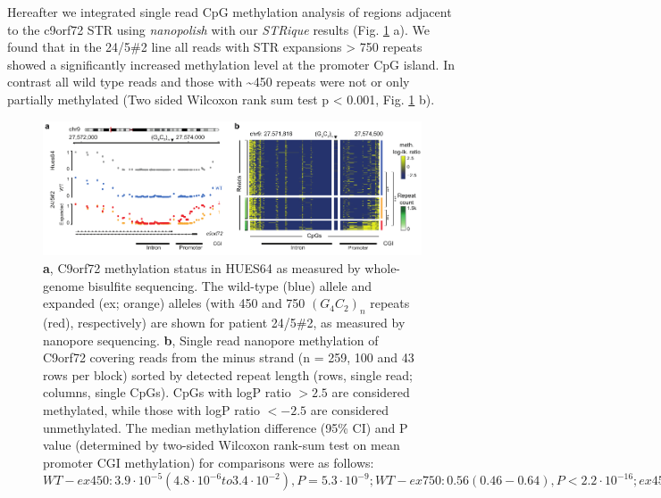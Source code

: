 Hereafter we integrated single read CpG methylation analysis of regions adjacent to the c9orf72 STR using \textit{nanopolish} \cite{Simpson2017} with our \textit{STRique} results (Fig. \ref{fig:strique:methylation_c9orf72_region} a). We found that in the 24/5\#2 line all reads with STR expansions > 750 repeats showed a significantly increased methylation level at the promoter CpG island. In contrast all wild type reads and those with \textasciitilde450 repeats were not or only partially methylated (Two sided Wilcoxon rank sum test p < 0.001, Fig. \ref{fig:strique:methylation_c9orf72_region} b).

\begin{figure}[h]
    \centering
    \includegraphics[width=1.0\textwidth]{figures/strique/methylation_c9orf72_region.pdf}
    \captionsetup{format=plain}
    \caption[Methylation state analyses at the single-read level]{\textbf{a}, C9orf72 methylation status in HUES64 as measured by whole-genome bisulfite sequencing. The wild-type (blue) allele and expanded (ex; orange) alleles (with 450 and 750 $ (G_{4}C_{2})_{n} $ repeats (red), respectively) are shown for patient 24/5\#2, as measured by nanopore sequencing. \textbf{b}, Single read nanopore methylation of C9orf72 covering reads from the minus strand (n = 259, 100 and 43 rows per block) sorted by detected repeat length (rows, single read; columns, single CpGs). CpGs with logP ratio $> 2.5$ are considered methylated, while those with logP ratio $< -2.5$ are considered unmethylated. The median methylation difference (95\% CI) and P value (determined by two-sided Wilcoxon rank-sum test on mean promoter CGI methylation) for comparisons were as follows: $ WT-ex450: 3.9 \cdot 10^{-5} (4.8 \cdot 10^{-6} to 3.4 \cdot 10^{-2}), P = 5.3 \cdot 10^{-9}; WT-ex750: 0.56 (0.46-0.64), P < 2.2 \cdot 10^{-16}; ex450-ex750: 0.53 (0.40-0.64), P < 2.2 \cdot 10^{-16}; ***P < 0.001. $ }
    \label{fig:strique:methylation_c9orf72_region}
\end{figure}

